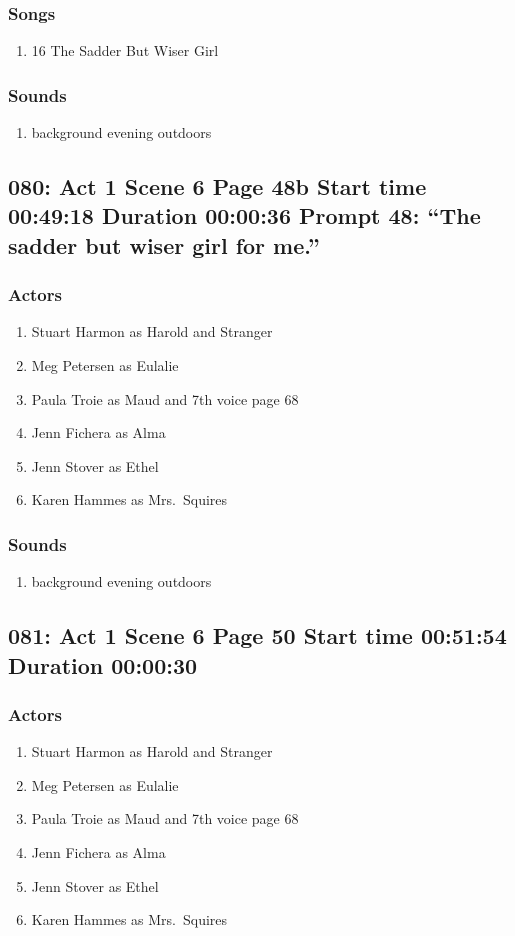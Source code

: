 \subsubsection{Songs}
\begin{enumerate}
\item 16 The Sadder But Wiser Girl
\end{enumerate}\subsubsection{Sounds}
\begin{enumerate}
\item background evening outdoors
\end{enumerate}
\subsection{080: Act 1 Scene 6 Page 48b Start time 00:49:18 Duration 00:00:36 Prompt 48: ``The sadder but wiser girl for me.''}

\subsubsection{Actors}
\begin{enumerate}
\item Stuart Harmon as Harold and Stranger
\item Meg Petersen as Eulalie
\item Paula Troie as Maud and 7th voice page 68
\item Jenn Fichera as Alma
\item Jenn Stover as Ethel
\item Karen Hammes as Mrs.~Squires
\end{enumerate}

\subsubsection{Sounds}
\begin{enumerate}
\item background evening outdoors
\end{enumerate}
\subsection{081: Act 1 Scene 6 Page 50 Start time 00:51:54 Duration 00:00:30}

\subsubsection{Actors}
\begin{enumerate}
\item Stuart Harmon as Harold and Stranger
\item Meg Petersen as Eulalie
\item Paula Troie as Maud and 7th voice page 68
\item Jenn Fichera as Alma
\item Jenn Stover as Ethel
\item Karen Hammes as Mrs.~Squires
\end{enumerate}

